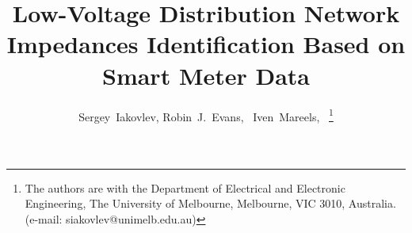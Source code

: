\documentclass[journal,10pt,onecolumn,draftclsnofoot,]{IEEEtran}
\theoremstyle{plain}
\theoremstyle{definition}
\theoremstyle{remark}
\begin{document}
%
\title{Low-Voltage Distribution Network \\ Impedances Identification Based on \\ Smart Meter Data}
%
%
%

\author{Sergey~Iakovlev,
        Robin~J.~Evans,~
        Iven~Mareels,~
\thanks{The authors are with the Department of Electrical
and Electronic Engineering, The University of Melbourne, Melbourne, VIC 3010,
Australia. (e-mail: siakovlev@unimelb.edu.au)}}

% 
%
\end{document}
